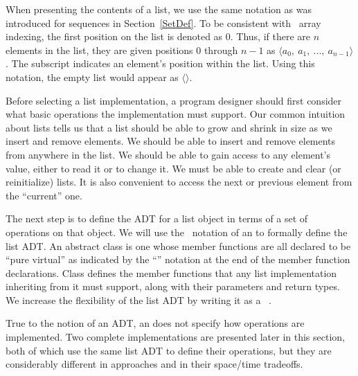 When presenting the contents of a list, we use the same notation
as was introduced for sequences in Section~\ref{SetDef}.
To be consistent with \Lang\ array indexing, the first position
on the list is denoted as 0.
Thus, if there are \(n\) elements in the list, they are given
positions 0 through \(n-1\) as
\(\langle a_0,\ a_1,\ ...,\ a_{n-1}\rangle \).
The subscript indicates an element's
position within the list.
Using this notation, the empty list would appear as
\(\langle \rangle\). 

Before selecting a list implementation, a program designer should
first consider what basic operations the implementation must support.
Our common intuition about lists tells us that a list should be able
to grow and shrink in size as we insert and remove
elements.
We should be able to insert and remove elements from anywhere in
the list.
We should be able to gain access to any element's value,
either to read it or to change it.
We must be able to create and clear (or reinitialize)
lists.
It is also convenient to access the next or previous
element from the ``current'' one.

The next step is to define the ADT for a list object in terms of a set
of operations on that object.
We will use the \Lang\ notation of 
an
to formally define the list ADT.
{An abstract class is one whose member functions are all declared to be
``pure virtual'' as indicated by the ``'' notation at the
end of the member function declarations.
Class}{}
 defines the member functions that any list
implementation inheriting from it must support, along with their
parameters and return types.
We increase the flexibility of the list ADT by writing it as a
\Lang\ \Gen.

True to the notion of an ADT, 
an
does not specify how operations are implemented.
Two complete implementations are presented later in this section,
both of which use the same list ADT to define their operations,
but they are  considerably different in approaches and in their
space/time tradeoffs.

